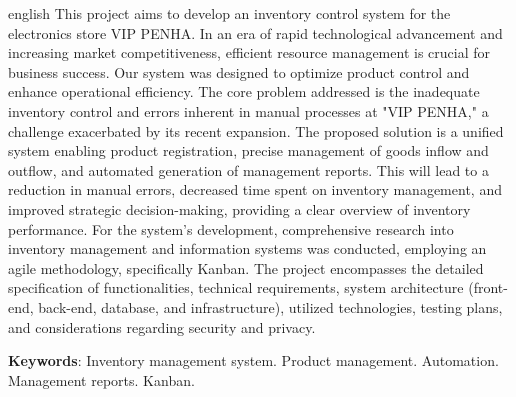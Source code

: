 \documentclass[
	12pt,				%
	openany,			%
	twoside,			%
	a4paper,			%
	english,			%
	brazil				%
	]{abntex2}
\newcommand{\listofquadrosname}{Lista de quadros}
\let\cleardoublepage\clearpage
\begin{document}
\begin{resumo}[Abstract]
 \begin{otherlanguage*}{english}
  This project aims to develop an inventory control system for the electronics store VIP PENHA. In an era of rapid technological advancement and increasing market competitiveness, efficient resource management is crucial for business success. Our system was designed to optimize product control and enhance operational efficiency.
The core problem addressed is the inadequate inventory control and errors inherent in manual processes at "VIP PENHA," a challenge exacerbated by its recent expansion. The proposed solution is a unified system enabling product registration, precise management of goods inflow and outflow, and automated generation of management reports. This will lead to a reduction in manual errors, decreased time spent on inventory management, and improved strategic decision-making, providing a clear overview of inventory performance.
For the system's development, comprehensive research into inventory management and information systems was conducted, employing an agile methodology, specifically Kanban. The project encompasses the detailed specification of functionalities, technical requirements, system architecture (front-end, back-end, database, and infrastructure), utilized technologies, testing plans, and considerations regarding security and privacy.

   \vspace{\onelineskip}
 
   \noindent 
   \textbf{Keywords}: Inventory management system. Product management. Automation. Management reports. Kanban.
 \end{otherlanguage*}
\end{resumo}



\listoffigures*
\clearpage

\pdfbookmark[0]{\listofquadrosname}{loq}
\listofquadros*
\cleardoublepage

\listoftables*
\cleardoublepage



\tableofcontents*
\cleardoublepage
\end{document}
